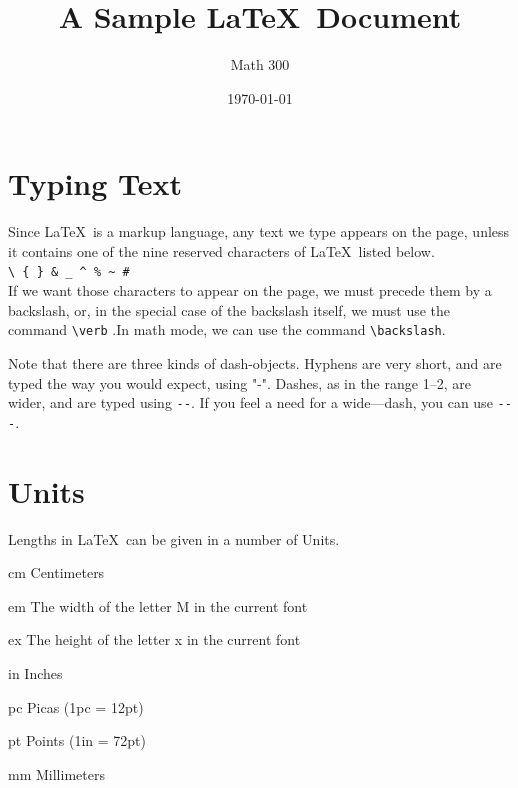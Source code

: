 \documentclass[12pt]{article}
\begin{document}
	\title{A Sample \LaTeX\ Document}
	\author{Math 300}
	\date{\today}
\maketitle
	
\section{Typing Text}
	Since \LaTeX\ is a markup language, any text we type appears on the page,
	unless it contains one of the nine reserved characters of \LaTeX\, listed below.\\
	
	\noindent
	\verb|\ { } & _ ^ % ~ # |\\
	
	\noindent
	If we want those characters to appear on the page, we must precede them by	a backslash, or, in the special case of the backslash itself, we must use the	command \verb|\verb| .In math mode, we can use the command \verb|\backslash|.
	
	Note that there are three kinds of dash-objects. Hyphens are very short, and are typed the way you would expect, using "-". Dashes, as in the range 1--2, are wider, and are typed using \verb|--|. If you feel a need for a wide---dash, you can use \verb|---|.

\section{Units}
	Lengths in \LaTeX\ can be given in a number of Units.
		
	cm \hspace{10pt} Centimeters
	
	em  \hspace{10pt} The width of the letter M in the current font
	
	ex  \hspace{14pt} The height of the letter x in the current font
	
	in \hspace{17pt} Inches
	
	pc \hspace{15pt} Picas (1pc = 12pt)
	
	pt \hspace{16pt} Points (1in = 72pt)
	
	mm \hspace{7pt} Millimeters
		
\newpage
\end{document}
